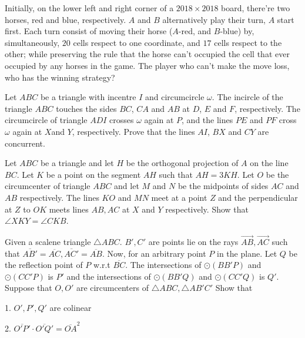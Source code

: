 \documentclass[11pt]{scrartcl}
\begin{document}
\begin{problem}[1637184643761804371]
Initially, on the lower left and right corner of a $2018\times 2018$ board, there're two horses, red and blue, respectively. $A$ and $B$ alternatively play their turn, $A$ start first. Each turn consist of moving their horse ($A$-red, and $B$-blue) by, simultaneously, $20$ cells respect to one coordinate, and $17$ cells respect to the other; while preserving the rule that the horse can't occupied the cell that ever occupied by any horses in the game. The player who can't make the move loss, who has the winning strategy?
\end{problem}
\begin{problem}[7553717274310387624]
Let $ABC$ be a triangle with incentre $I$ and circumcircle $\omega$. The incircle of the triangle $ABC$
touches the sides $BC$, $CA$ and $AB$ at $D$, $E$ and $F$, respectively. The circumcircle of triangle $ADI$ crosses $\omega$ again at $P$, and the lines $PE$ and $PF$ cross $\omega$ again at $X$and $Y$, respectively. Prove that the lines $AI$, $BX$ and $CY$ are concurrent.
\end{problem}
\begin{problem}[493493847475466779]
Let $ABC$ be a triangle and let $H$ be the orthogonal projection of $A$ on the line $BC$. Let $K$ be a point on the segment $AH$ such that $AH = 3 KH$. Let $O$ be the circumcenter of triangle $ABC$ and let $M$ and $N$ be the midpoints of sides $AC$ and $AB$ respectively. The lines $KO$ and $MN$ meet at a point $Z$ and the perpendicular at $Z$ to $OK$ meets lines $AB, AC$ at $X$ and $Y$ respectively. Show that $\angle XKY = \angle CKB$.
\end{problem}
\begin{problem}[1810915585111530473]
	Given a scalene triangle $ \triangle ABC $. $ B', C' $ are points lie on the rays $ \overrightarrow{AB}, \overrightarrow{AC}  $ such that $ \overline{AB'} = \overline{AC}, \overline{AC'} = \overline{AB} $. Now, for an arbitrary point $ P $ in the plane. Let $ Q $ be the reflection point of $ P $ w.r.t $ \overline{BC} $. The intersections of $ \odot{\left(BB'P\right)} $ and $ \odot{\left(CC'P\right)} $ is $ P' $ and the intersections of $ \odot{\left(BB'Q\right)} $ and $ \odot{\left(CC'Q\right)} $ is $ Q' $. Suppose that $ O, O' $ are circumcenters of $ \triangle{ABC}, \triangle{AB'C'} $ Show that

1. $ O', P', Q' $ are colinear

2. $  \overline{O'P'} \cdot  \overline{O'Q'} = \overline{OA}^{2} $
\end{problem}
\end{document}
